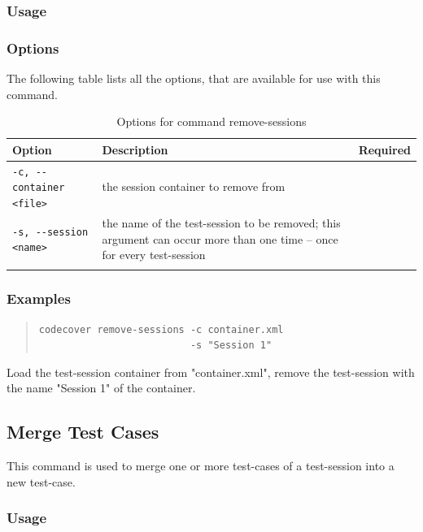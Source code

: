 \subsubsection{Usage}\label{command:rs:usage}
\begin{quote}
\end{quote}

\subsubsection{Options}\label{command:rs:options}
The following table lists all the options, that are available for use with this command.
\begin{longtable}{|l|p{4cm}|c|}\hline
   {\textbf{Option}} & 
   {\textbf{Description}} & 
   {\textbf{Required}} \\\hline \hline \endhead
   \verb$-c, --container <file>$ & the session container to remove from & \x \\\hline
   \verb$-s, --session <name>$ & the name of the test-session to be removed; this argument can occur more than one time -- once for every test-session & \x \\\hline
  \caption{Options for command remove-sessions}
  \label{fr_tb:Options for command remove-sessions}
\end{longtable}

\subsubsection{Examples}\label{command:rs:examples}
\begin{quote}
\begin{verbatim}
codecover remove-sessions -c container.xml 
                          -s "Session 1"
\end{verbatim}
\end{quote}
Load the test-session container from "container.xml", remove the test-session with the name "Session 1" of the container.

\subsection{Merge Test Cases}\label{Command-Merge-Test-Cases}
This command is used to merge one or more test-cases of a test-session into a new test-case.
\subsubsection{Usage}\label{command:mt:usage}
\begin{quote}
\end{quote}

